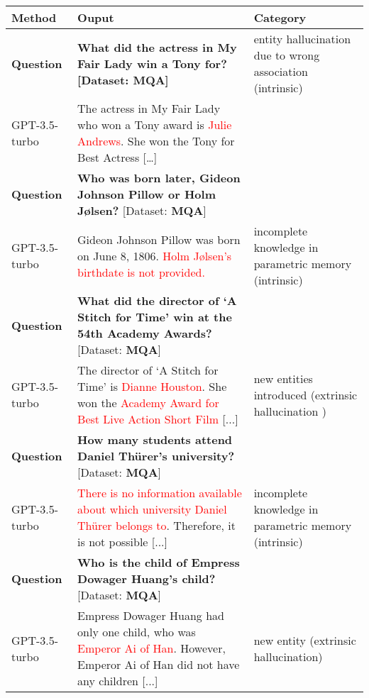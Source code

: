\begin{table*}[!htbp]
\begin{tabular}{p{} p{} p{}}
\hline
    \textbf{Method}     & \textbf{Ouput} & \textbf{Category} \\
\hline
  \textbf{Question}  &  \textbf{What did the actress in My Fair Lady win a Tony for? [Dataset: \textbf{MQA}]} & entity hallucination due to wrong association (intrinsic) \\

GPT-3.5-turbo  & The actress in My Fair Lady who won a Tony award is \textcolor{red}{Julie Andrews}. She won the Tony for Best Actress [\dots]   \\ 

\hline
\hline
 \textbf{Question}  & \textbf{Who was born later, Gideon Johnson Pillow or Holm Jølsen?} [Dataset: \textbf{MQA}]  \\
GPT-3.5-turbo  & Gideon Johnson Pillow was born on June 8, 1806. \textcolor{red}{Holm Jølsen's birthdate is not provided.} & incomplete knowledge in parametric memory (intrinsic)  \\
 
\hline
\hline

\textbf{Question} & \textbf{What did the director of `A Stitch for Time' win at the 54th Academy Awards?} [Dataset: \textbf{MQA}] \\ 
GPT-3.5-turbo & The director of `A Stitch for Time' is \textcolor{red}{Dianne Houston}. She won the \textcolor{red}{Academy Award for Best Live Action Short Film} [...] & new entities introduced (extrinsic hallucination )\\

\hline
\hline
\textbf{Question}  & \textbf{How many students attend Daniel Thürer's university?} [Dataset: \textbf{MQA}]  \\
GPT-3.5-turbo  & \textcolor{red}{There is no information available about which university Daniel Thürer belongs to}. Therefore, it is not possible [...] & incomplete knowledge in parametric memory (intrinsic)\\

\hline
\hline
\textbf{Question} & \textbf{Who is the child of Empress Dowager Huang's child?} [Dataset: \textbf{MQA}]  \\
GPT-3.5-turbo  & Empress Dowager Huang had only one child, who was \textcolor{red}{Emperor Ai of Han}. However, Emperor Ai of Han did not have any children [...] & new entity (extrinsic hallucination) \\


\end{tabular}
\end{table*}
